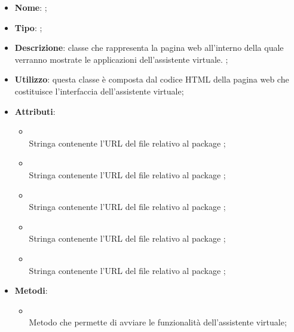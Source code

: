 \begin{itemize}
	\item \textbf{Nome}: ;
	\item \textbf{Tipo}: ;
	\item \textbf{Descrizione}: classe che rappresenta la pagina web all'interno della quale verranno mostrate le applicazioni dell'assistente virtuale. ;
	\item \textbf{Utilizzo}: questa classe è composta dal codice HTML della pagina web che costituisce l'interfaccia dell'assistente virtuale;
	\item \textbf{Attributi}:
	\begin{itemize}
		\item[]  \\
		Stringa contenente l'URL del file relativo al package ;
		\item[]  \\
		Stringa contenente l'URL del file relativo al package ;
		\item[]  \\
		Stringa contenente l'URL del file relativo al package ;
		\item[]  \\
		Stringa contenente l'URL del file relativo al package ;
		\item[]  \\
		Stringa contenente l'URL del file relativo al package ;
	\end{itemize}
	\item \textbf{Metodi}:
	\begin{itemize}
		\item[]  \\
		Metodo che permette di avviare le funzionalità dell'assistente virtuale;\\
	\end{itemize}
\end{itemize}

